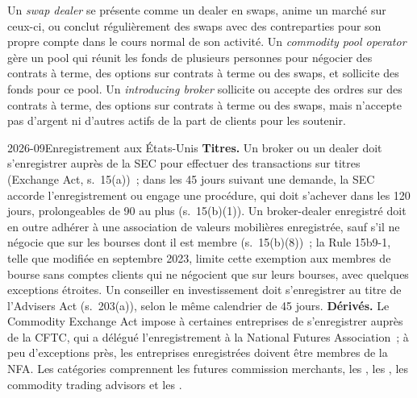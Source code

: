 \begin{definition}\label{def:fm:regulators-and-licences:cftc}
Un \emph{swap dealer} se présente comme un dealer en swaps, anime un marché sur ceux-ci, ou conclut régulièrement des swaps avec
des contreparties pour son propre compte dans le cours normal de son activité. Un \emph{commodity pool operator} gère un pool
qui réunit les fonds de plusieurs personnes pour négocier des contrats à terme, des options sur contrats à terme ou des swaps, et sollicite des fonds pour ce pool. Un \emph{introducing
broker} sollicite ou accepte des ordres sur des contrats à terme, des options sur contrats à terme ou des swaps, mais n'accepte pas d'argent ni d'autres actifs de la part
de clients pour les soutenir.
\end{definition}

\begin{dated}{2026-09}{Enregistrement aux États-Unis}\label{dat:fm:regulators-and-licences:us}
\textbf{Titres.} Un broker ou un dealer doit s'enregistrer auprès de la SEC pour effectuer des transactions sur titres (Exchange Act, s.~15(a))~; dans les 45 jours
suivant une demande, la SEC accorde l'enregistrement ou engage une procédure, qui doit s'achever dans les 120 jours, prolongeables de 90 au plus (s.~15(b)(1)). Un broker-dealer enregistré doit en outre adhérer
à une association de valeurs mobilières enregistrée, sauf s'il ne négocie que sur les bourses dont il est membre (s.~15(b)(8))~; la Rule 15b9-1, telle que modifiée en septembre 2023,
limite cette exemption aux membres de bourse sans comptes clients qui ne négocient que
sur leurs bourses, avec quelques exceptions étroites. Un conseiller en investissement doit s'enregistrer au titre de l'Advisers Act (s.~203(a)), selon le même calendrier de 45 jours. \textbf{Dérivés.}
Le Commodity Exchange Act impose à certaines entreprises de s'enregistrer auprès de la CFTC, qui a délégué l'enregistrement à la National
Futures Association~; à peu d'exceptions près, les entreprises enregistrées doivent être membres de la NFA. Les catégories comprennent les futures commission merchants, les
, les , les commodity trading advisors et les .
\end{dated}

